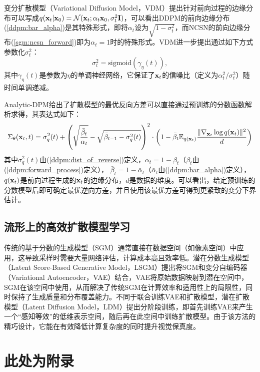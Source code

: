 \documentclass[11pt,a4paper,UTF8]{ctexart}
\begin{document}
变分扩散模型（Variational Diffusion Model，VDM）\cite{kingma2021variational}提出针对前向过程的边缘分布可以写成$q(\mathbf{x}_t|\mathbf{x}_0)=\mathcal{N}(\mathbf{x}_t;\alpha_t\mathbf{x}_0,\sigma_t^2\mathbf{I})$，可以看出DDPM的前向边缘分布(\ref{ddpm:bar_alpha})是其特殊形式，即将$\alpha_t$设为$\sqrt{1-\sigma_t^2}$，而NCSN的前向边缘分布(\ref{sgm:ncsn_forward})即为$\alpha_t=1$时的特殊形式。VDM进一步提出通过如下方式参数化$\sigma_t^2$：
\begin{equation*}
    \sigma_t^2=\text{sigmoid}(\gamma_\eta(t)),
\end{equation*}
其中$\gamma_\eta(t)$是参数为$\eta$的单调神经网络，它保证了$\mathbf{x}_t$的信噪比（\cite{kingma2021variational}定义为$\alpha_t^2/\sigma_t^2$）随时间单调递减。

Analytic-DPM\cite{bao2021analytic}给出了扩散模型的最优反向方差可以直接通过预训练的分数函数解析求得，其表达式如下：
\begin{equation*}
    \Sigma_\theta(\mathbf{x}_t,t)=\sigma_q^2(t) + \left(\sqrt{\frac{\bar{\beta}_t}{\alpha_t}} -\sqrt{\bar{\beta}_{t-1}-\sigma_q^2(t)} \right)^2\cdot \left(1-\bar{\beta}_t \mathbb{E}_{q(\mathbf{x}_t)}\frac{\|\nabla_{\mathbf{x}_t}\log q(\mathbf{x}_t) \|^2}{d} \right)
\end{equation*}
其中$\sigma_q^2(t)$由(\ref{ddpm:dist_of_reverse})定义，$\alpha_t=1-\beta_t$（$\beta_t$由(\ref{ddpm:forward_process})定义），
$\bar{\beta}_t=1-\bar{\alpha}_t$（$\bar{\alpha}_t$由(\ref{ddpm:bar_alpha})定义），$q(\mathbf{x}_t)$是前向过程生成的$\mathbf{x}_t$的边缘分布，$d$是数据的维度。可以看出，给定预训练的分数模型后即可确定最优逆向方差，并且使用该最优方差可得到更紧致的变分下界估计。

\subsection{流形上的高效扩散模型学习}

传统的基于分数的生成模型（SGM）通常直接在数据空间（如像素空间）中应用，这导致采样时需要大量网络评估，计算成本高且效率低。潜在分数生成模型（Latent Score-Based Generative Model，LSGM）\cite{vahdat2021score}提出将SGM和变分自编码器（Variational Autoencoder，VAE）结合，VAE将原始数据映射到潜在空间中，SGM在该空间中使用，从而解决了传统SGM在计算效率和适用性上的局限性，同时保持了生成质量和分布覆盖能力。不同于联合训练VAE和扩散模型，潜在扩散模型（Latent Diffusion Model，LDM）\cite{rombach2022high}提出分阶段训练，即首先训练VAE来产生一个“感知等效”的低维表示空间，随后再在此空间中训练扩散模型。由于该方法的精巧设计，它能在有效降低计算复杂度的同时提升视觉保真度。




\newpage


\newpage
\appendix


\section{此处为附录}
\end{document}
